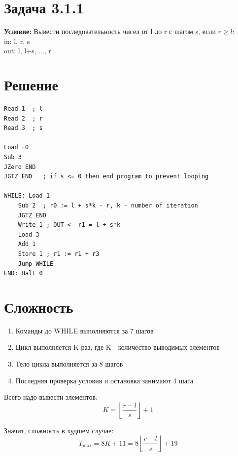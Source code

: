 \documentclass[12pt]{article}
\begin{document}
\section*{Задача 3.1.1}

\textbf{Условие:} Вывести последовательность чисел от l до r с шагом s, если $r \ge l$:\\
in: l, r, s \\
out: l, l+s, ..., r

\section*{Решение}

\begin{verbatim}
Read 1  ; l
Read 2  ; r
Read 3  ; s

Load =0
Sub 3
JZero END
JGTZ END   ; if s <= 0 then end program to prevent looping

WHILE: Load 1
    Sub 2  ; r0 := l + s*k - r, k - number of iteration
    JGTZ END
    Write 1 ; OUT <- r1 = l + s*k
    Load 3
    Add 1
    Store 1 ; r1 := r1 + r3
    Jump WHILE
END: Halt 0
\end{verbatim}

\section*{Сложность}

\begin{enumerate}
    \item Команды до WHILE выполняются за 7 шагов
    \item Цикл выполняется K раз, где K - количество выводимых элементов
    \item Тело цикла выполняется за 8 шагов
    \item Последняя проверка условия и остановка занимают 4 шага
\end{enumerate}

Всего надо вывести элементов:
\[
    K = \left\lfloor \frac{r - l}{s} \right\rfloor + 1
\]

Значит, сложность в худшем случае:
\[
    T_{\max} = 8K + 11 = 8\left\lfloor \frac{r - l}{s} \right\rfloor + 19
\]
\end{document}

